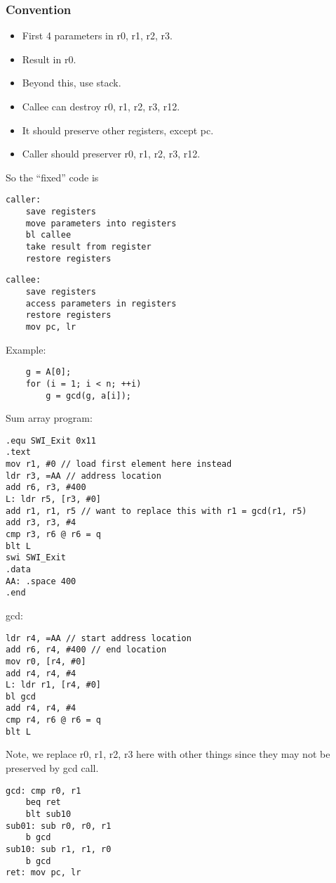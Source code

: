 \documentclass{scrartcl}
\begin{document}
\subsubsection{Convention}
\begin{itemize}
	\item First 4 parameters in r0, r1, r2, r3.
	\item Result in r0.
	\item Beyond this, use stack.
	\item Callee can destroy r0, r1, r2, r3, r12.
	\item It should preserve other registers, except pc.
	\item Caller should preserver r0, r1, r2, r3, r12.
\end{itemize}

So the ``fixed'' code is
\begin{lstlisting}
caller:
	save registers
	move parameters into registers
	bl callee
	take result from register
	restore registers
\end{lstlisting}
\begin{lstlisting}
callee:
	save registers
	access parameters in registers
	restore registers
	mov pc, lr
\end{lstlisting}

Example:
\begin{lstlisting}
	g = A[0];
	for (i = 1; i < n; ++i)
		g = gcd(g, a[i]);
\end{lstlisting}

Sum array program:
\begin{lstlisting}
.equ SWI_Exit 0x11
.text
mov r1, #0 // load first element here instead
ldr r3, =AA // address location
add r6, r3, #400
L: ldr r5, [r3, #0]
add r1, r1, r5 // want to replace this with r1 = gcd(r1, r5)
add r3, r3, #4
cmp r3, r6 @ r6 = q
blt L
swi SWI_Exit
.data
AA: .space 400
.end
\end{lstlisting}
gcd:
\begin{lstlisting}
ldr r4, =AA // start address location
add r6, r4, #400 // end location
mov r0, [r4, #0]
add r4, r4, #4
L: ldr r1, [r4, #0]
bl gcd
add r4, r4, #4
cmp r4, r6 @ r6 = q
blt L
\end{lstlisting}
Note, we replace r0, r1, r2, r3 here with other things since they may not be preserved by gcd call.
\begin{lstlisting}
gcd: cmp r0, r1
	beq ret
	blt sub10
sub01: sub r0, r0, r1
	b gcd
sub10: sub r1, r1, r0
	b gcd
ret: mov pc, lr
\end{lstlisting}
\end{document}
